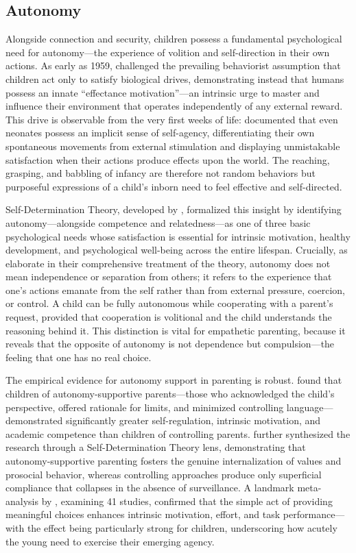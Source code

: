 \subsection{Autonomy}

Alongside connection and security, children possess a fundamental psychological need for autonomy---the experience of volition and self-direction in their own actions.
As early as 1959, \citet{white1959} challenged the prevailing behaviorist assumption that children act only to satisfy biological drives, demonstrating instead that humans possess an innate ``effectance motivation''---an intrinsic urge to master and influence their environment that operates independently of any external reward.
This drive is observable from the very first weeks of life: \citet{rochat2001} documented that even neonates possess an implicit sense of self-agency, differentiating their own spontaneous movements from external stimulation and displaying unmistakable satisfaction when their actions produce effects upon the world.
The reaching, grasping, and babbling of infancy are therefore not random behaviors but purposeful expressions of a child's inborn need to feel effective and self-directed.

Self-Determination Theory, developed by \citet{deci2000}, formalized this insight by identifying autonomy---alongside competence and relatedness---as one of three basic psychological needs whose satisfaction is essential for intrinsic motivation, healthy development, and psychological well-being across the entire lifespan.
Crucially, as \citet{ryan2017} elaborate in their comprehensive treatment of the theory, autonomy does not mean independence or separation from others; it refers to the experience that one's actions emanate from the self rather than from external pressure, coercion, or control.
A child can be fully autonomous while cooperating with a parent's request, provided that cooperation is volitional and the child understands the reasoning behind it.
This distinction is vital for empathetic parenting, because it reveals that the opposite of autonomy is not dependence but compulsion---the feeling that one has no real choice.

The empirical evidence for autonomy support in parenting is robust.
\citet{grolnick1989} found that children of autonomy-supportive parents---those who acknowledged the child's perspective, offered rationale for limits, and minimized controlling language---demonstrated significantly greater self-regulation, intrinsic motivation, and academic competence than children of controlling parents.
\citet{joussemet2008} further synthesized the research through a Self-Determination Theory lens, demonstrating that autonomy-supportive parenting fosters the genuine internalization of values and prosocial behavior, whereas controlling approaches produce only superficial compliance that collapses in the absence of surveillance.
A landmark meta-analysis by \citet{patall2008}, examining 41 studies, confirmed that the simple act of providing meaningful choices enhances intrinsic motivation, effort, and task performance---with the effect being particularly strong for children, underscoring how acutely the young need to exercise their emerging agency.

